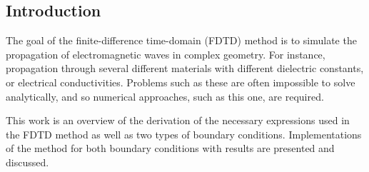 \documentclass[12pt]{article}
\begin{document}
\begin{multicols}{2}
\section{Introduction}
The goal of the finite-difference time-domain (FDTD) method is to simulate the propagation of electromagnetic waves in complex geometry. For instance, propagation through several different materials with different dielectric constants, or electrical conductivities. Problems such as these are often impossible to solve analytically, and so numerical approaches, such as this one, are required.

This work is an overview of the derivation of the necessary expressions used in the FDTD method as well as two types of boundary conditions. Implementations of the method for both boundary conditions with results are presented and discussed.

\end{multicols}
\end{document}
